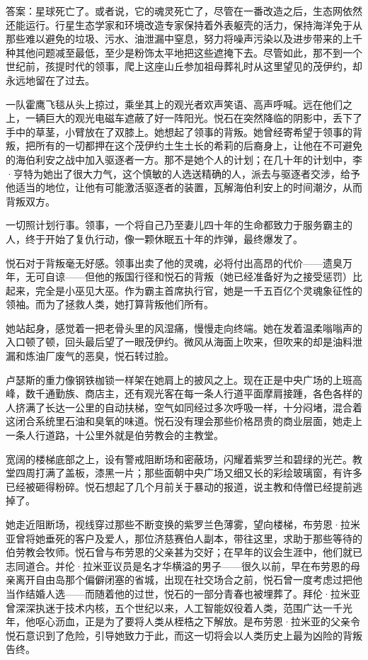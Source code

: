 \documentclass[AutoFakeBold=true]{book}
\begin{document}
答案：星球死亡了。或者说，它的魂灵死亡了，尽管在一番改造之后，生态网依然还能运行。行星生态学家和环境改造专家保持着外表躯壳的活力，保持海洋免于从那些难以避免的垃圾、污水、油泄漏中窒息，努力将噪声污染以及进步带来的上千种其他问题减至最低，至少是粉饰太平地把这些遮掩下去。尽管如此，那不到一个世纪前，孩提时代的领事，爬上这座山丘参加祖母葬礼时从这里望见的茂伊约，却永远地留在了过去。

一队霍鹰飞毯从头上掠过，乘坐其上的观光者欢声笑语、高声呼喊。远在他们之上，一辆巨大的观光电磁车遮蔽了好一阵阳光。悦石在突然降临的阴影中，丢下了手中的草茎，小臂放在了双膝上。她想起了领事的背叛。她曾经{\kaishu 寄希望}于领事的背叛，把所有的一切都押在这个茂伊约土生土长的希莉的后裔身上，让他在不可避免的海伯利安之战中加入驱逐者一方。那不是她个人的计划；在几十年的计划中，李·亨特为她出了很大力气，这个慎敏的人选送精确的人，派去与驱逐者交涉，给予他适当的地位，让他有可能激活驱逐者的装置，瓦解海伯利安上的时间潮汐，从而背叛双方。

一切照计划行事。领事，一个将自己乃至妻儿四十年的生命都致力于服务霸主的人，终于开始了复仇行动，像一颗休眠五十年的炸弹，最终爆发了。

悦石对于背叛毫无好感。领事出卖了他的灵魂，必将付出高昂的代价——遗臭万年，无可自谅——但他的叛国行径和悦石的背叛（她已经准备好为之接受惩罚）比起来，完全是小巫见大巫。作为霸主首席执行官，她是一千五百亿个灵魂象征性的领袖。而为了拯救人类，她打算背叛他们所有。

她站起身，感觉着一把老骨头里的风湿痛，慢慢走向终端。她在发着温柔嗡嗡声的入口顿了顿，回头最后望了一眼茂伊约。微风从海面上吹来，但吹来的却是油料泄漏和炼油厂废气的恶臭，悦石转过脸。

\vspace*{1em}

卢瑟斯的重力像钢铁枷锁一样架在她肩上的披风之上。现在正是中央广场的上班高峰，数千通勤族、商店主，还有观光客在每一条人行道平面摩肩接踵，各色各样的人挤满了长达一公里的自动扶梯，空气如同经过多次呼吸一样，十分闷堵，混合着这闭合系统里石油和臭氧的味道。悦石没有理会那些价格昂贵的商业层面，她走上一条人行道路，十公里外就是伯劳教会的主教堂。

宽阔的楼梯底部之上，设有警戒阻断场和密蔽场，闪耀着紫罗兰和碧绿的光芒。教堂四周打满了盖板，漆黑一片；那些面朝中央广场又细又长的彩绘玻璃窗，有许多已经被砸得粉碎。悦石想起了几个月前关于暴动的报道，说主教和侍僧已经提前逃掉了。

她走近阻断场，视线穿过那些不断变换的紫罗兰色薄雾，望向楼梯，布劳恩·拉米亚曾将她垂死的客户及爱人，那位济慈赛伯人副本，带往这里，求助于那些等待的伯劳教会牧师。悦石曾与布劳恩的父亲甚为交好；在早年的议会生涯中，他们就已志同道合。并伦·拉米亚议员是名才华横溢的男子——很久以前，早在布劳恩的母亲离开自由岛那个偏僻闭塞的省城，出现在社交场合之前，悦石曾一度考虑过把他当作结婚人选——而随着他的过世，悦石的一部分青春也被埋葬了。拜伦·拉米亚曾深深执迷于技术内核，五个世纪以来，人工智能奴役着人类，范围广达一千光年，他呕心沥血，正是为了要将人类从桎梏之下解放。是布劳恩·拉米亚的父亲令悦石意识到了危险，引导她致力于此，而这一切将会以人类历史上最为凶险的背叛告终。
\end{document}
